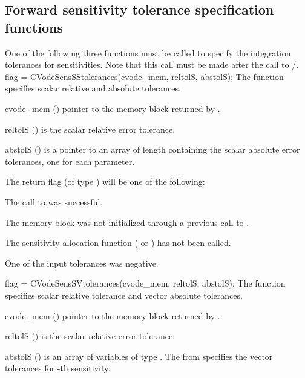 \subsection{Forward sensitivity tolerance specification functions}
\label{sss:cvfwdtolerances}
One of the following three functions must be called to specify the
integration tolerances for sensitivities. Note that this call must be made after 
the call to /.
{
  flag = CVodeSensSStolerances(cvode\_mem, reltolS, abstolS);
}
{
  The function  specifies scalar relative and absolute
  tolerances.
}
{
  \begin{args}
  \item[cvode\_mem] ()
    pointer to the {\cvodes} memory block returned by .
  \item[reltolS] ()
    is the scalar relative error tolerance.
  \item[abstolS] ()
    is a pointer to an array of length  containing the scalar absolute error
    tolerances, one for each parameter.
  \end{args}
}
{
  The return flag  (of type ) will be one of the following:
  \begin{args}
  \item[\Id{CV\_SUCCESS}]
    The call to  was successful.
  \item[\Id{CV\_MEM\_NULL}] 
    The {\cvodes} memory block was not initialized through a previous call to
    .
  \item[\Id{CV\_NO\_SENS}] 
    The sensitivity allocation function ( or )
    has not been called.
  \item[\Id{CV\_ILL\_INPUT}] 
    One of the input tolerances was negative.
  \end{args}
}
{}
{
  flag = CVodeSensSVtolerances(cvode\_mem, reltolS, abstolS);
}
{
  The function  specifies scalar relative tolerance and
  vector absolute tolerances.
}
{
  \begin{args}
  \item[cvode\_mem] ()
    pointer to the {\cvodes} memory block returned by .
  \item[reltolS] ()
    is the scalar relative error tolerance.
  \item[abstolS] ()
    is an array of  variables of type . The  from
     specifies the vector tolerances for -th sensitivity.
  \end{args}
}
